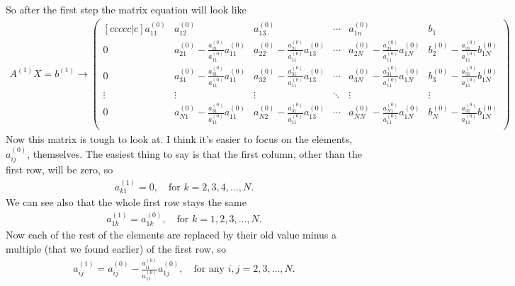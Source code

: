 So after the first step the matrix equation will look like
\begin{align*}
A^{(1)}X = b^{(1)} \to 
\begin{pmatrix}[ccccc|c]
a^{(0)}_{11} & a^{(0)}_{12}                                                  & a^{(0)}_{13}                                                  & \cdots & a^{(0)}_{1n}                                                  & b_1    \\
0            & a^{(0)}_{21} - \frac{a^{(0)}_{21}}{a^{(0)}_{11}} a^{(0)}_{11} & a^{(0)}_{22} - \frac{a^{(0)}_{21}}{a^{(0)}_{11}} a^{(0)}_{13} & \cdots & a^{(0)}_{2N} - \frac{a^{(0)}_{21}}{a^{(0)}_{11}} a^{(0)}_{1N} & b^{(0)}_2  - \frac{a^{(0)}_{21}}{a^{(0)}_{11}} b^{(0)}_{1N} \\
0            & a^{(0)}_{31} - \frac{a^{(0)}_{31}}{a^{(0)}_{11}} a^{(0)}_{11} & a^{(0)}_{32} - \frac{a^{(0)}_{31}}{a^{(0)}_{11}} a^{(0)}_{13} & \cdots & a^{(0)}_{3N} - \frac{a^{(0)}_{31}}{a^{(0)}_{11}} a^{(0)}_{1N} & b^{(0)}_3  - \frac{a^{(0)}_{31}}{a^{(0)}_{11}} b^{(0)}_{1N} \\
\vdots       & \vdots                                                        & \vdots                                                        & \ddots & \vdots                                                        & \vdots \\
0            & a^{(0)}_{N1} - \frac{a^{(0)}_{31}}{a^{(0)}_{11}} a^{(0)}_{11} & a^{(0)}_{N2} - \frac{a^{(0)}_{31}}{a^{(0)}_{11}} a^{(0)}_{13} & \cdots & a^{(0)}_{NN} - \frac{a^{(0)}_{N1}}{a^{(0)}_{11}} a^{(0)}_{1N} & b^{(0)}_N  - \frac{a^{(0)}_{31}}{a^{(0)}_{11}} b^{(0)}_{1N} \\
\end{pmatrix}
\end{align*}
Now this matrix is tough to look at. I think it's easier to focus on the elements, $a^{(0)}_{ij}$, themselves. The easiest thing to say is that the first column, other than the first row, will be zero, so
\begin{align*}
a^{(1)}_{k1} = 0,  \quad \text{for } k=2,3,4,\dots,N.
\end{align*}
We can see also that the whole first row stays the same
\begin{align*}
a^{(1)}_{1k} = a^{(0)}_{1k},  \quad \text{for } k=1,2,3,\dots,N.
\end{align*}
Now each of the rest of the elements are replaced by their old value minus a multiple (that we found earlier) of the first row, so
\begin{align*}
a^{(1)}_{ij} = a^{(0)}_{ij} - \frac{a^{(0)}_{i1}}{a^{(0)}_{11}}a^{(0)}_{1j},  \quad \text{for any } i,j=2,3,\dots,N.
\end{align*}
